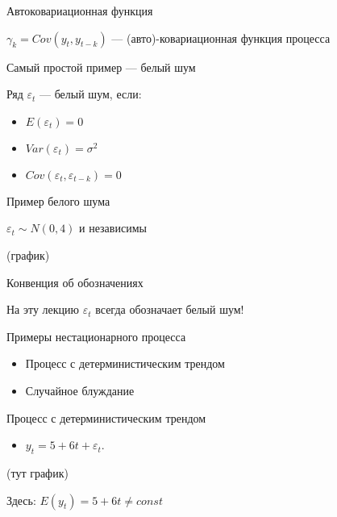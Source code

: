 \documentclass[ignorenonframetext,]{beamer}
\begin{document}
\begin{frame}{Автоковариационная функция}

$\gamma_k=Cov(y_t, y_{t-k})$ --- (авто)-ковариационная функция процесса

\end{frame}

\begin{frame}{Самый простой пример --- белый шум}

Ряд $\varepsilon_t$ --- белый шум, если:

\begin{itemize}
\itemsep1pt\parskip0pt
\item
  $E(\varepsilon_t)=0$
\item
  $Var(\varepsilon_t)=\sigma^2$
\item
  $Cov(\varepsilon_t,\varepsilon_{t-k})=0$
\end{itemize}

\end{frame}

\begin{frame}{Пример белого шума}

$\varepsilon_t \sim N(0,4)$ и независимы

(график)

\end{frame}

\begin{frame}{Конвенция об обозначениях}

На эту лекцию $\varepsilon_t$ всегда обозначает белый шум!

\end{frame}

\begin{frame}{Примеры нестационарного процесса}

\begin{itemize}
\item
  Процесс с детерминистическим трендом
\item
  Случайное блуждание
\end{itemize}

\end{frame}

\begin{frame}{Процесс с детерминистическим трендом}

\begin{itemize}
\itemsep1pt\parskip0pt
\item
  $y_t= 5 + 6t + \varepsilon_t$.
\end{itemize}

(тут график)

Здесь: $E(y_t)=5+6t\neq const$

\end{frame}
\end{document}
